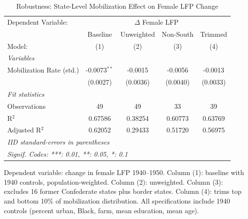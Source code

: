 
\begin{table}[htbp]
   \caption{\label{tab:robust_state} Robustness: State-Level Mobilization Effect on Female LFP Change}
   \centering
   \begin{tabular}{lcccc}
      \tabularnewline \midrule \midrule
      Dependent Variable: & \multicolumn{4}{c}{$\Delta$ Female LFP}\\
                               & Baseline       & Unweighted & Non-South & Trimmed \\   
      Model:                   & (1)            & (2)        & (3)       & (4)\\  
      \midrule
      \emph{Variables}\\
      Mobilization Rate (std.) & -0.0073$^{**}$ & -0.0015    & -0.0056   & -0.0013\\   
                               & (0.0027)       & (0.0036)   & (0.0040)  & (0.0033)\\   
      \midrule
      \emph{Fit statistics}\\
      Observations             & 49             & 49         & 33        & 39\\  
      R$^2$                    & 0.67586        & 0.38254    & 0.60773   & 0.63769\\  
      Adjusted R$^2$           & 0.62052        & 0.29433    & 0.51720   & 0.56975\\  
      \midrule \midrule
      \multicolumn{5}{l}{\emph{IID standard-errors in parentheses}}\\
      \multicolumn{5}{l}{\emph{Signif. Codes: ***: 0.01, **: 0.05, *: 0.1}}\\
   \end{tabular}
   
   \par \raggedright 
   Dependent variable: change in female LFP 1940--1950. Column (1): baseline with 1940 controls, population-weighted. Column (2): unweighted. Column (3): excludes 16 former Confederate states plus border states. Column (4): trims top and bottom 10\% of mobilization distribution. All specifications include 1940 controls (percent urban, Black, farm, mean education, mean age).
\end{table}


